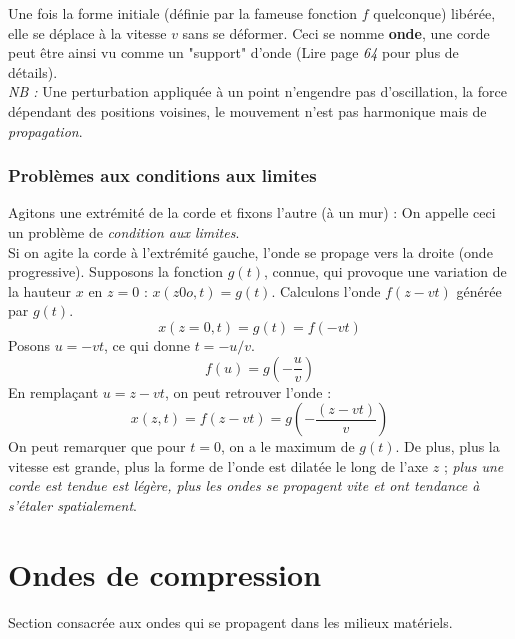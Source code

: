 \documentclass	[11pt, a4paper, openany]{book}
\begin{document}
		Une fois la forme initiale (définie par la fameuse fonction $f$ quelconque) libérée, elle se déplace à la vitesse $v$ sans se déformer. Ceci se nomme \textbf{onde}, une corde peut être ainsi vu comme un "support" d'onde (Lire page \textit{64} pour plus de détails).\\
		
		\textit{NB :} Une perturbation appliquée à un point n'engendre pas d'oscillation, la force dépendant des positions voisines, le mouvement n'est pas harmonique mais de \textit{propagation}.
		
		\subsubsection{Problèmes aux conditions aux limites}
		Agitons une extrémité de la corde et fixons l'autre (à un mur) : On appelle ceci un problème de \textit{condition aux limites}.\\
		
		Si on agite la corde à l'extrémité gauche, l'onde se propage vers la droite (onde progressive). Supposons la fonction $g(t)$, connue, qui provoque une variation de la hauteur $x$ en $z = 0$ : $x(z0o, t) = g(t)$. Calculons l'onde $f(z-vt)$ générée par $g(t)$.
		\begin{equation}
			x(z=0, t) = g(t) = f(-vt)
		\end{equation}
		Posons $u = -vt$, ce qui donne $t=-u/v$.
		\begin{equation}
			f(u) = g(-\frac{u}{v})
		\end{equation}
		En remplaçant $u = z - vt$, on peut retrouver l'onde : 
		\begin{equation}
			x(z, t) = f(z - vt) = g(-\frac{(z-vt)}{v})
		\end{equation}
		On peut remarquer que pour $t=0$, on a le maximum de $g(t)$. De plus, plus la vitesse est grande, plus la forme de l'onde est dilatée le long de l'axe $z$ ; \textit{plus une corde est tendue est légère, plus les ondes se propagent vite et ont tendance à s'étaler spatialement}.
		
		\section{Ondes de compression}
		Section consacrée aux ondes qui se propagent dans les milieux matériels.
		
\end{document}
